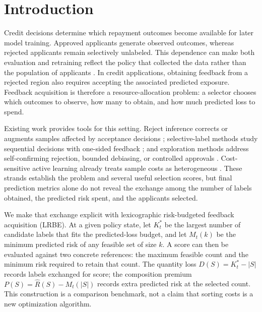 \section{Introduction}
\label{sec:introduction}

Credit decisions determine which repayment outcomes become available for later model training. Approved applicants generate observed outcomes, whereas rejected applicants remain selectively unlabeled. This dependence can make both evaluation and retraining reflect the policy that collected the data rather than the population of applicants \cite{lakkaraju2017selective,kleinberg2018human}. In credit applications, obtaining feedback from a rejected region also requires accepting the associated predicted exposure. Feedback acquisition is therefore a resource-allocation problem: a selector chooses which outcomes to observe, how many to obtain, and how much predicted loss to spend.

Existing work provides tools for this setting. Reject inference corrects or augments samples affected by acceptance decisions \cite{banasik2007reject,marshall2010selection}; selective-label methods study sequential decisions with one-sided feedback \cite{wei2021selective,jiang2021onesided}; and exploration methods address self-confirming rejection, bounded debiasing, or controlled approvals \cite{pacchiano2021plot,yang2022bounded,scarone2026illusion}. Cost-sensitive active learning already treats sample costs as heterogeneous \cite{donmez2008proactive,tomanek2010cost}. These strands establish the problem and several useful selection scores, but final prediction metrics alone do not reveal the exchange among the number of labels obtained, the predicted risk spent, and the applicants selected.

We make that exchange explicit with lexicographic risk-budgeted feedback acquisition (LRBE). At a given policy state, let $K_t^*$ be the largest number of candidate labels that fits the predicted-loss budget, and let $M_t(k)$ be the minimum predicted risk of any feasible set of size $k$. A score can then be evaluated against two concrete references: the maximum feasible count and the minimum risk required to retain that count. The quantity loss $D(S)=K_t^*-|S|$ records labels exchanged for score; the composition premium $P(S)=\widehat R(S)-M_t(|S|)$ records extra predicted risk at the selected count. This construction is a comparison benchmark, not a claim that sorting costs is a new optimization algorithm.

